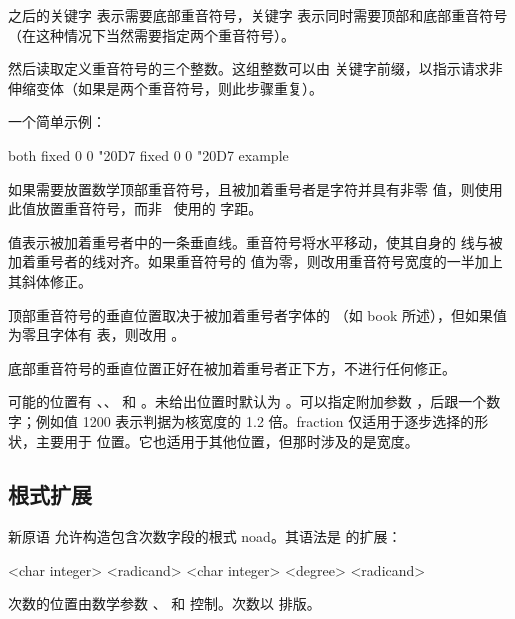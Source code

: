  之后的关键字  表示需要底部重音符号，关键字  表示同时需要顶部和底部重音符号（在这种情况下当然需要指定两个重音符号）。

然后读取定义重音符号的三个整数。这组整数可以由  关键字前缀，以指示请求非伸缩变体（如果是两个重音符号，则此步骤重复）。

一个简单示例：

\begin{typing}
\Umathaccent both fixed 0 0 "20D7 fixed 0 0 "20D7 {example}
\end{typing}

如果需要放置数学顶部重音符号，且被加着重号者是字符并具有非零  值，则使用此值放置重音符号，而非 \ 使用的  字距。

 值表示被加着重号者中的一条垂直线。重音符号将水平移动，使其自身的  线与被加着重号者的线对齐。如果重音符号的  值为零，则改用重音符号宽度的一半加上其斜体修正。

顶部重音符号的垂直位置取决于被加着重号者字体的 （如 \TEX book 所述），但如果值为零且字体有  表，则改用 。

底部重音符号的垂直位置正好在被加着重号者正下方，不进行任何修正。

可能的位置有 、、 和 。未给出位置时默认为 。可以指定附加参数 ，后跟一个数字；例如值 1200 表示判据为核宽度的 1.2 倍。fraction 仅适用于逐步选择的形状，主要用于  位置。它也适用于其他位置，但那时涉及的是宽度。

\subsection{根式扩展}


新原语  允许构造包含次数字段的根式 noad。其语法是  的扩展：

\begin{typing}
 <char integer> <radicand>
 <char integer> <degree> <radicand>
\end{typing}

次数的位置由数学参数 、 和  控制。次数以  排版。

